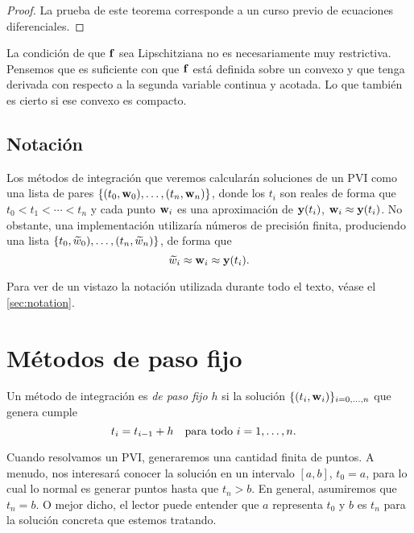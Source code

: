 \begin{proof}
    La prueba de este teorema corresponde a
    un curso previo de ecuaciones diferenciales.
\end{proof}

\begin{remark}
    La condición de que $\vb{f}{}$ sea Lipschitziana no es necesariamente
    muy restrictiva.
    Pensemos que es suficiente con que $\vb{f}{}$ está definida sobre un convexo y
    que tenga derivada con respecto a la segunda variable continua y acotada.
    Lo que también es cierto si ese convexo es compacto.
\end{remark}

\subsection{Notación}

Los métodos de integración que veremos calcularán soluciones de un PVI
como una lista de pares $\{(t_0, \vb{w}{}_0), \ldots, (t_n, \vb{w}{}_n)\}$,
donde los $t_i$ son reales de forma que $t_0 < t_1 < \cdots < t_n$
y cada punto $\vb{w}{}_i$ es una aproximación de $\vb{y}{}(t_i)$,
$\vb{w}{}_i \approx \vb{y}{}(t_i)$.
No obstante, una implementación utilizaría números de precisión finita,
produciendo una lista $\{t_0, \widetilde{w}_0), \ldots, (t_n, \widetilde{w}_n)\}$,
de forma que
\begin{equation*}
    \widetilde{w}_i \approx \vb{w}{}_i \approx \vb{y}{}(t_i).
\end{equation*}

Para ver de un vistazo la notación utilizada durante todo el texto,
véase el \cref{sec:notation}.

\section{Métodos de paso fijo}

\begin{definition}
    Un método de integración es \emph{de paso fijo $h$} si la solución
    $\{(t_i, \vb{w}{}_i)\}_{i = 0,\ldots,n}$ que genera cumple
    \begin{equation*}
        t_i = t_{i-1} + h \qq{para todo $i = 1,\ldots,n$.}
    \end{equation*}
\end{definition}

Cuando resolvamos un PVI, generaremos una cantidad finita de puntos.
A menudo, nos interesará conocer la solución en un intervalo $[a, b]$,
$t_0 = a$,
para lo cual lo normal es generar puntos hasta que $t_n > b$.
En general, asumiremos que $t_n = b$.
O mejor dicho, el lector puede entender que $a$ representa $t_0$
y $b$ es $t_n$ para la solución concreta que estemos tratando.

